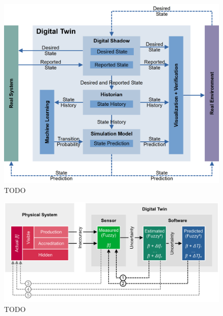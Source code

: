 \documentclass[9pt,conference]{IEEEtran}
\begin{document}
    \begin{figure}[htbp]
        \includegraphics[width=\columnwidth]{Digital Twin.png}
        \caption{TODO}
        \label{todo}
    \end{figure}

    \begin{figure}[htbp]
        \includegraphics[width=\columnwidth]{Digital Twin Deviation.png}
        \caption{TODO}
        \label{todo}
    \end{figure}
\end{document}
